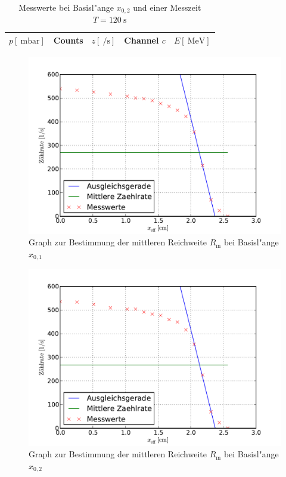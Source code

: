 		\begin{table}[h!]
			\begin{center}
				\caption{Messwerte bei Basisl"ange $x_{0,2}$ und einer Messzeit $T = \SI{120}{\second}$ \label{table:messung1-2}}
				\begin{tabular}{|r|r|r|r|r|}
					\hline
						\multicolumn{1}{|c|}{$p [\SI{}{\milli \bar}]$}& 
						\multicolumn{1}{c|}{Counts} & 
						\multicolumn{1}{c|}{$z \left[\SI{}{\per \second}\right]$} & 
						\multicolumn{1}{c|}{Channel $c$} & 
						\multicolumn{1}{c|}{$E [\SI{}{\mega \electronvolt}]$} \\
					\hline 
					\hline
						
					\hline 
				\end{tabular}
			\end{center}
		\end{table}

		\begin{figure}[h]
			\centering
			\includegraphics[width = 13cm]{img/zaehlrate1.pdf}
			\caption{Graph zur Bestimmung der mittleren Reichweite $R_\mathrm{m}$ bei Basisl"ange $x_{0,1}$ \label{fig:zaehlrate1}}
		\end{figure}

		\begin{figure}[h]
			\centering
			\includegraphics[width = 15cm]{img/zaehlrate2.pdf}
			\caption{Graph zur Bestimmung der mittleren Reichweite $R_\mathrm{m}$ bei Basisl"ange $x_{0,2}$ \label{fig:zaehlrate2}}
		\end{figure}

